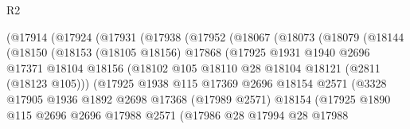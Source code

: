 \begin{lexlean}{R2}
\begin{coremodule}
                  (@17914
                    (@17924
                      (@17931
                        (@17938
                          (@17952
                            (@18067
                              (@18073
                                (@18079
                                  (@18144
                                    (@18150
                                      (@18153
                                        (@18105 @18156)
                                        @17868
                                        (@17925
                                          @1931
                                          @1940
                                          @2696
                                          @17371
                                          @18104
                                          @18156
                                          (@18102
                                            @105
                                            @18110
                                            @28
                                            @18104
                                            @18121
                                            (@2811 (@18123 @105)))
                                          (@17925
                                            @1938
                                            @115
                                            @17369
                                            @2696
                                            @18154
                                            @2571
                                            (@3328
                                              @17905
                                              @1936
                                              @1892
                                              @2698
                                              @17368
                                              (@17989 @2571)
                                              @18154
                                              (@17925
                                                @1890
                                                @115
                                                @2696
                                                @2696
                                                @17988
                                                @2571
                                                (@17986
                                                  @28
                                                  @17994
                                                  @28
                                                  @17988

\end{coremodule}
\end{lexlean}
